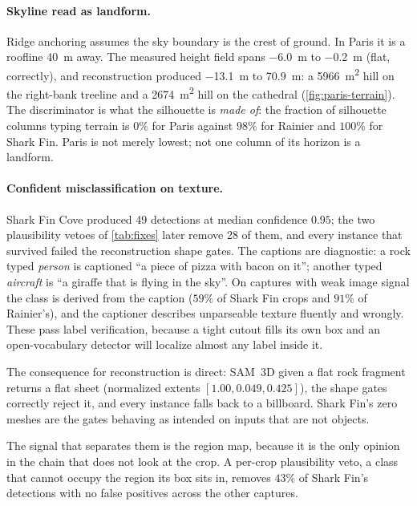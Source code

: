 \paragraph{Skyline read as landform.}
Ridge anchoring assumes the sky boundary is the crest of ground. In Paris it is a
roofline \SI{40}{\meter} away. The measured height field spans
\SI{-6.0}{\meter} to \SI{-0.2}{\meter} (flat, correctly), and reconstruction
produced \SI{-13.1}{\meter} to \SI{+70.9}{\meter}: a \SI{5966}{\meter\squared}
hill on the right-bank treeline and a \SI{2674}{\meter\squared} hill on the
cathedral (\cref{fig:paris-terrain}). The discriminator is what the silhouette is \emph{made of}: the fraction
of silhouette columns typing terrain is $0\%$ for Paris against $98\%$ for Rainier
and $100\%$ for Shark Fin. Paris is not merely lowest; not one column of its
horizon is a landform.

\paragraph{Confident misclassification on texture.}
Shark Fin Cove produced 49 detections at median confidence $0.95$; the two
plausibility vetoes of \cref{tab:fixes} later remove 28 of them, and every instance
that survived failed the reconstruction shape gates. The captions are diagnostic: a rock typed
\emph{person} is captioned ``a piece of pizza with bacon on it''; another typed
\emph{aircraft} is ``a giraffe that is flying in the sky''. On captures with weak
image signal the class is derived from the caption ($59\%$ of Shark Fin crops and
$91\%$ of Rainier's), and the captioner describes unparseable texture fluently
and wrongly. These pass label verification, because a tight cutout fills its own
box and an open-vocabulary detector will localize almost any label inside it.

The consequence for reconstruction is direct: SAM~3D given a flat rock fragment
returns a flat sheet (normalized extents $[1.00, 0.049, 0.425]$), the shape gates
correctly reject it, and every instance falls back to a billboard. Shark Fin's zero
meshes are the gates behaving as intended on inputs that are not objects.

The signal that separates them is the region map, because it is the only opinion in
the chain that does not look at the crop. A per-crop plausibility veto, a class
that cannot occupy the region its box sits in, removes $43\%$ of Shark Fin's
detections with no false positives across the other captures.

